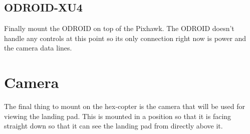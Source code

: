 \documentclass[10pt,notitlepage]{article}
\begin{document}
\subsection{ODROID-XU4}
Finally mount the ODROID on top of the Pixhawk. The ODROID doesn't handle any controls at this point so its only connection right now is power and the camera data lines.

\section{Camera}
The final thing to mount on the hex-copter is the camera that will be used for viewing the landing pad. This is mounted in a position so that it is facing straight down so that it can see the landing pad from directly above it.
\end{document}
